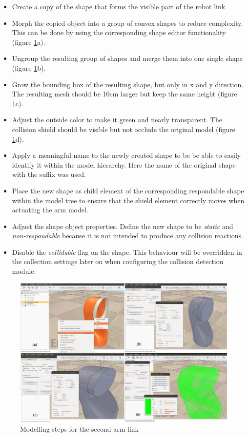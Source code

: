 \begin{itemize}
\item
Create a copy of the shape that forms the visible part of the robot link
\item
Morph the copied object into a group of convex shapes to reduce complexity. This can be done by using the corresponding shape editor functionality (figure \ref{fig:shield_steps}a).
\item
Ungroup the resulting group of shapes and merge them into one single shape (figure \ref{fig:shield_steps}b).
\item
Grow the bounding box of the resulting shape, but only in x and y direction. The resulting mesh should be 10cm larger but keep the same height (figure \ref{fig:shield_steps}c).
\item
Adjust the outside color to make it green and nearly transparent. The collision shield should be visible but not occlude the original model (figure \ref{fig:shield_steps}d).
\item
Apply a meaningful name to the newly created shape to be be able to easily identify it within the model hierarchy. Here the name of the original shape with the  suffix was used.
\item
Place the new shape as child element of the corresponding respondable shape within the model tree to ensure that the shield element correctly moves when actuating the arm model.
\item
Adjust the shape object properties. Define the new shape to be \emph{static} and \emph{non-respondable} because it is not intended to produce any collision reactions.
\item
Disable the \emph{collidable} flag on the shape. This behaviour will be overridden in the collection
settings later on when configuring the collision detection module.
\end{itemize}

\begin{figure}[h]
	\centering
  	\includegraphics[angle=90, width=1.0\textwidth]{images/shield_steps.jpg}
	\caption{Modelling steps for the second arm link}
	\label{fig:shield_steps}
\end{figure}

